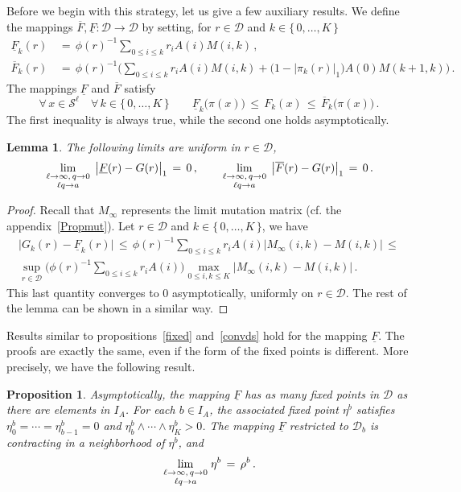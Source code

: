 \documentclass[a4paper,12pt]{article}
\newtheorem{lemma}[theorem]{Lemma}
\newtheorem{proposition}[theorem]{Proposition}
\theoremstyle{definition}
\theoremstyle{remark}
\def \cD {\mathcal{D}}
\def \cS {\mathcal{S}}
\def \lra {\longrightarrow}
\def \zk {\{\, 0,\dots,K \,\}}
\def\lq {{\genfrac{}{}{0pt}{1}{\ell\to\infty,\,q\to0}{\ell q\to a}}}
\begin{document}
Before we begin with this strategy, let us give a few auxiliary results.
We define the mappings 
$\overline{F},\underline{F}:\cD\lra\cD$
by setting,
for $r\in\cD$ and $k\in\zk$
\begin{align*}
\underline{F}_k(r)\,&=\,\phi(r)^{-1}\sum_{0\leq i\leq k}
r_iA(i)M(i,k)\,,\\
\overline{F}_k(r)\,&=\,\phi(r)^{-1}\bigg(
\sum_{0\leq i\leq k}
r_iA(i)M(i,k)+\big(1-|\pi_k(r)|_1\big)A(0)M(k+1,k)\bigg)\,.
\end{align*}
The mappings $\underline{F}$ and $\overline{F}$ satisfy
$$\forall\,x\in\cS^\ell\quad
\forall\, k\in\zk\qquad
\underline{F}_k\big(
\pi(x)
\big)\,\leq\,
F_k(x)\,\leq\,
\overline{F}_k\big(
\pi(x)\big)\,.$$
The first inequality is always true,
while the second one holds asymptotically.
\begin{lemma}
\label{convunifGF}
The following limits are uniform in $r\in\cD$,
$$
\lim_\lq\,\big|
\underline{F}(r)-G(r)
\big|_1\,=\,0\,,\qquad
\lim_\lq\,\big|
\overline{F}(r)-G(r)
\big|_1\,=\,0\,.
$$
\end{lemma}
\begin{proof}
Recall that $M_\infty$
represents the limit mutation matrix (cf. the appendix~\ref{Propmut}).
Let $r\in\cD$ and $k\in\zk$, we have
\begin{multline*}
\big|
G_k(r)-\underline{F}_k(r)
\big|\,\leq\,\phi(r)^{-1}
\sum_{0\leq i\leq k}
r_iA(i)\big|M_\infty(i,k)-M(i,k)\big|\,\leq\\
\sup_{r\in\cD}\bigg(\phi(r)^{-1} 
\sum_{0\leq i\leq k} r_iA(i)
\bigg)
\max_{0\leq i,k\leq K}\big|
M_\infty(i,k)-M(i,k)
\big|\,.
\end{multline*}
This last quantity converges to $0$ asymptotically,
uniformly on $r\in\cD$. The rest of the lemma can be shown 
in a similar way.
\end{proof}
Results similar to propositions~\ref{fixed} and~\ref{convds} hold 
for the mapping $\underline{F}$.
The proofs are exactly the same,
even if the form of the fixed points is different.
More precisely,
we have the following result.
\begin{proposition}
Asymptotically, the mapping $\underline{F}$
has as many fixed points in $\cD$ as there are elements in $I_A$.
For each $b\in I_A$,
the associated fixed point $\eta^b$ satisfies $\eta^b_0=\cdots=\eta^b_{b-1}=0$
and $\eta^b_{b}\wedge\cdots\wedge\eta^b_K>0$.
The mapping $\underline{F}$ restricted to $\cD_b$ is
contracting in a neighborhood of $\eta^b$, and
$$\lim_\lq\eta^b\,=\,\rho^b\,.$$
\end{proposition}
\end{document}
